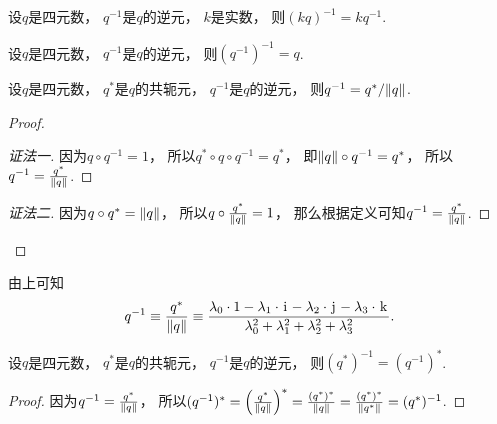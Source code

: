 \begin{property}
设\(q\)是四元数，
\(q^{-1}\)是\(q\)的逆元，
\(k\)是实数，
则\((k q)^{-1} = k q^{-1}\).
\end{property}

\begin{property}
设\(q\)是四元数，
\(q^{-1}\)是\(q\)的逆元，
则\((q^{-1})^{-1} = q\).
\end{property}

\begin{property}
设\(q\)是四元数，
\(q^*\)是\(q\)的共轭元，
\(q^{-1}\)是\(q\)的逆元，
则\(q^{-1} = q^* / \norm{q}\).
\begin{proof}\hfill
\begin{proof}[证法一]
因为\(q \circ q^{-1} = 1\)，
所以\(q^* \circ q \circ q^{-1} = q^*\)，
即\(\norm{q} \circ q^{-1} = q^*\)，
所以\(q^{-1} = \frac{q^*}{\norm{q}}\).
\end{proof}
\begin{proof}[证法二]
因为\(q \circ q^* = \norm{q}\)，
所以\(q \circ \frac{q^*}{\norm{q}} = 1\)，
那么根据定义可知\(q^{-1} = \frac{q^*}{\norm{q}}\).
\end{proof}
\let\qed\relax
\end{proof}
\end{property}
\begin{remark}
由上可知\begin{equation*}
	q^{-1}
	\equiv
	\frac{q^*}{\norm{q}}
	\equiv
	\frac{
		\lambda_0 \cdot 1
		- \lambda_1 \cdot \kern1pt\mathrm{i}\kern1pt
		- \lambda_2 \cdot \kern1pt\mathrm{j}\kern1pt
		- \lambda_3 \cdot \kern1pt\mathrm{k}\kern1pt
	}{
		\lambda_0^2
		+ \lambda_1^2
		+ \lambda_2^2
		+ \lambda_3^2
	}.
\end{equation*}
\end{remark}

\begin{property}
设\(q\)是四元数，
\(q^*\)是\(q\)的共轭元，
\(q^{-1}\)是\(q\)的逆元，
则\((q^*)^{-1} = (q^{-1})^*\).
\begin{proof}
因为\(q^{-1} = \frac{q^*}{\norm{q}}\)，
所以\(
	(q^{-1})^*
	= \left( \frac{q^*}{\norm{q}} \right)^*
	= \frac{(q^*)^*}{\norm{q}}
	= \frac{(q^*)^*}{\norm{q^*}}
	= (q^*)^{-1}
\).
\end{proof}
\end{property}

